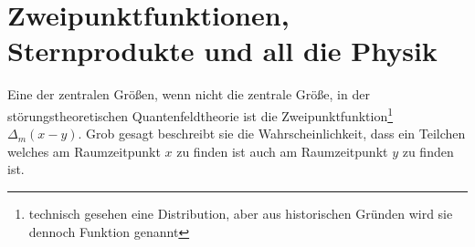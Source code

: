 
\section{Zweipunktfunktionen, Sternprodukte und all die Physik} %
\label{sec:zweipunktfunktionen_sternprodukte_und_all_die_physik}


Eine der zentralen Größen, wenn nicht die zentrale Größe, in der störungstheoretischen Quantenfeldtheorie ist die Zweipunktfunktion\footnote{technisch gesehen eine Distribution, aber aus historischen Gründen wird sie dennoch Funktion genannt} $\Delta_m (x-y)$. Grob gesagt beschreibt sie die Wahrscheinlichkeit, dass ein Teilchen welches am Raumzeitpunkt $x$ zu finden ist auch am Raumzeitpunkt $y$ zu finden ist.

